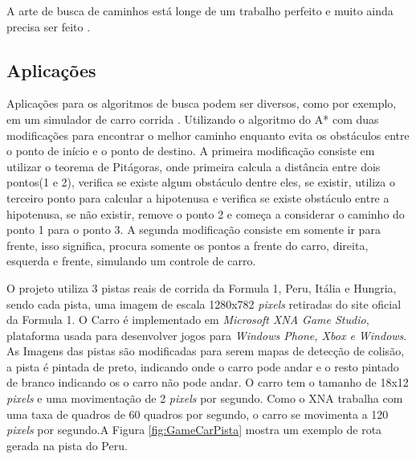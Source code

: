 A arte de busca de caminhos está longe de um trabalho perfeito e muito ainda precisa ser feito \cite{Pontevia}.

\subsection{Aplicações}
Aplicações para os algoritmos de busca podem ser diversos, como por exemplo, em um simulador de carro corrida \cite{JungTing}. Utilizando o algoritmo do A* com duas modificações para encontrar o melhor caminho enquanto evita os obstáculos entre o ponto de início e o ponto de destino. 
A primeira modificação consiste em utilizar o teorema de Pitágoras, onde primeira calcula a distância entre dois pontos(1 e 2), verifica se existe algum obstáculo dentre eles, se existir, utiliza o terceiro ponto para calcular a hipotenusa e verifica se existe obstáculo entre a hipotenusa, se não existir, remove o ponto 2 e começa a considerar o caminho do ponto 1 para o ponto 3. A segunda modificação consiste em somente ir para frente, isso significa, procura somente os pontos a frente do carro, direita, esquerda e frente, simulando um controle de carro.

O projeto utiliza 3 pistas reais de corrida da Formula 1, Peru, Itália e Hungria, sendo cada pista, uma imagem de escala 1280x782 \textit{pixels} retiradas do site oficial da Formula 1. O Carro é implementado em \textit{Microsoft XNA Game Studio}, plataforma usada para desenvolver jogos para \textit{Windows Phone, Xbox e Windows}. As Imagens das pistas são modificadas para serem mapas de detecção de colisão, a pista é pintada de preto, indicando onde o carro pode andar e o resto pintado de branco indicando os o carro não pode andar. O carro tem o tamanho de 18x12 \textit{pixels} e uma movimentação de 2 \textit{pixels} por segundo. Como o XNA trabalha com uma taxa de quadros de 60 quadros por segundo, o carro se movimenta a 120 \textit{pixels} por segundo.A Figura \ref{fig:GameCarPista} mostra um exemplo de rota gerada na pista do Peru.

\begin{minipage}{\linewidth}
	\label{fig:GameCarPista}
\end{minipage}

